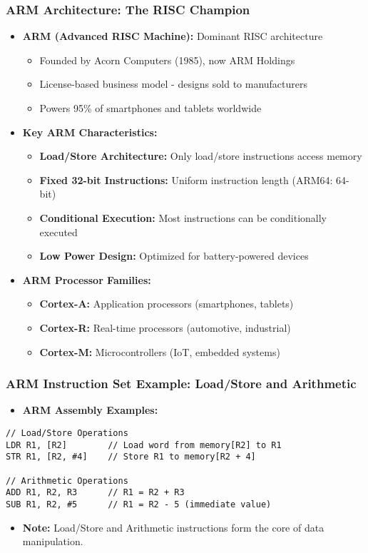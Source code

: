 \begin{frame}
\frametitle{ARM Architecture: The RISC Champion}
\begin{itemize}
    \item \textbf{ARM (Advanced RISC Machine):} Dominant RISC architecture
    \begin{itemize}
        \item Founded by Acorn Computers (1985), now ARM Holdings
        \item License-based business model - designs sold to manufacturers
        \item Powers 95\% of smartphones and tablets worldwide
    \end{itemize}
    \item \textbf{Key ARM Characteristics:}
    \begin{itemize}
        \item \textbf{Load/Store Architecture:} Only load/store instructions access memory
        \item \textbf{Fixed 32-bit Instructions:} Uniform instruction length (ARM64: 64-bit)
        \item \textbf{Conditional Execution:} Most instructions can be conditionally executed
        \item \textbf{Low Power Design:} Optimized for battery-powered devices
    \end{itemize}
    \item \textbf{ARM Processor Families:}
    \begin{itemize}
        \item \textbf{Cortex-A:} Application processors (smartphones, tablets)
        \item \textbf{Cortex-R:} Real-time processors (automotive, industrial)
        \item \textbf{Cortex-M:} Microcontrollers (IoT, embedded systems)
    \end{itemize}
\end{itemize}
\end{frame}

\begin{frame}[fragile]
\frametitle{ARM Instruction Set Example: Load/Store and Arithmetic}
\begin{itemize}
    \item \textbf{ARM Assembly Examples:}
\end{itemize}
\begin{verbatim}
// Load/Store Operations
LDR R1, [R2]        // Load word from memory[R2] to R1
STR R1, [R2, #4]    // Store R1 to memory[R2 + 4]

// Arithmetic Operations  
ADD R1, R2, R3      // R1 = R2 + R3
SUB R1, R2, #5      // R1 = R2 - 5 (immediate value)
\end{verbatim}
\begin{itemize}
    \item \textbf{Note:} Load/Store and Arithmetic instructions form the core of data manipulation.
\end{itemize}
\end{frame}

